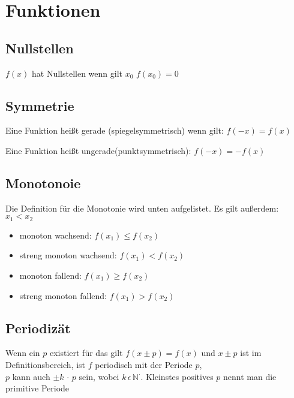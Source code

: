 \documentclass[a4paper]{scrartcl}
\begin{document}
    \section{Funktionen}

    \subsection{Nullstellen}
    $f(x)$ hat Nullstellen wenn gilt $x_0$  $f(x_0) = 0$

    \subsection{Symmetrie}
    \begin{description}
        \item Eine Funktion heißt gerade (spiegelsymmetrisch) wenn gilt: $f(-x) = f(x)$ 
        \item Eine Funktion heißt ungerade(punktsymmetrisch): $f(-x) = -f(x)$
    \end{description}
    
    \subsection{Monotonoie} 
    Die Definition für die Monotonie wird unten aufgelistet. Es gilt außerdem: $x_1 < x_2 $ 
    \begin{itemize}
        \item monoton wachsend:  $f(x_1) \leq f(x_2)$
        \item streng monoton wachsend: $f(x_1) < f(x_2)$
        \item monoton fallend:  $f(x_1) \geq f(x_2)$
        \item streng monoton fallend:  $f(x_1) > f(x_2)$
    \end{itemize}
    
    \subsection{Periodizät}
    Wenn ein $p$ existiert für das gilt $f(x \pm p) = f(x)$ und $x \pm p$ ist im Definitionsbereich, ist $f$ periodisch mit der Periode $p$,\\
    $p$ kann auch $\pm k \,  \cdot  \,p$ sein, wobei $k \, \epsilon \, \mathbb{N}^ \cdot $. Kleinstes positives $p$ nennt man die primitive Periode
    
\end{document}

